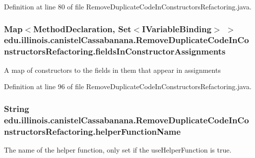 Definition at line 80 of file RemoveDuplicateCodeInConstructorsRefactoring.java.

\hypertarget{classedu_1_1illinois_1_1canistelCassabanana_1_1RemoveDuplicateCodeInConstructorsRefactoring_af04c901de5714458dd9511acf45bd472}{
\subsubsection[{fieldsInConstructorAssignments}]{\setlength{\rightskip}{0pt plus 5cm}Map$<$MethodDeclaration, Set$<$IVariableBinding$>$ $>$ {\bf edu.illinois.canistelCassabanana.RemoveDuplicateCodeInConstructorsRefactoring.fieldsInConstructorAssignments}}}
\label{classedu_1_1illinois_1_1canistelCassabanana_1_1RemoveDuplicateCodeInConstructorsRefactoring_af04c901de5714458dd9511acf45bd472}
A map of constructors to the fields in them that appear in assignments 

Definition at line 96 of file RemoveDuplicateCodeInConstructorsRefactoring.java.

\hypertarget{classedu_1_1illinois_1_1canistelCassabanana_1_1RemoveDuplicateCodeInConstructorsRefactoring_aeec592ffa5b5903205515925d84c2bb8}{
\subsubsection[{helperFunctionName}]{\setlength{\rightskip}{0pt plus 5cm}String {\bf edu.illinois.canistelCassabanana.RemoveDuplicateCodeInConstructorsRefactoring.helperFunctionName}}}
\label{classedu_1_1illinois_1_1canistelCassabanana_1_1RemoveDuplicateCodeInConstructorsRefactoring_aeec592ffa5b5903205515925d84c2bb8}
The name of the helper function, only set if the {\ttfamily useHelperFunction} is {\ttfamily true}. 

